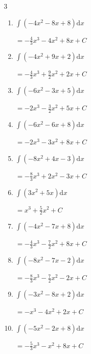\begin{multicols}{3}
\begin{enumerate}
        $\displaystyle =2x^{3}-4x^{2}+7x+ C$

  \item $\displaystyle \int \left( -4x^{2}-8x+8 \right) \mathrm{d}x$

        $\displaystyle =-\frac{4}{3}x^{3}-4x^{2}+8x+ C$

  \item $\displaystyle \int \left( -4x^{2}+9x+2 \right) \mathrm{d}x$

        $\displaystyle =-\frac{4}{3}x^{3}+\frac{9}{2}x^{2}+2x+ C$

  \item $\displaystyle \int \left( -6x^{2}-3x+5 \right) \mathrm{d}x$

        $\displaystyle =-2x^{3}-\frac{3}{2}x^{2}+5x+ C$

  \item $\displaystyle \int \left( -6x^{2}-6x+8 \right) \mathrm{d}x$

        $\displaystyle =-2x^{3}-3x^{2}+8x+ C$

  \item $\displaystyle \int \left( -8x^{2}+4x-3 \right) \mathrm{d}x$

        $\displaystyle =-\frac{8}{3}x^{3}+2x^{2}-3x+ C$

  \item $\displaystyle \int \left( 3x^{2}+5x \right) \mathrm{d}x$

        $\displaystyle =x^{3}+\frac{5}{2}x^{2}+ C$

  \item $\displaystyle \int \left( -4x^{2}-7x+8 \right) \mathrm{d}x$

        $\displaystyle =-\frac{4}{3}x^{3}-\frac{7}{2}x^{2}+8x+ C$

  \item $\displaystyle \int \left( -8x^{2}-7x-2 \right) \mathrm{d}x$

        $\displaystyle =-\frac{8}{3}x^{3}-\frac{7}{2}x^{2}-2x+ C$

\columnbreak %

\resetques

  \item $\displaystyle \int \left( -3x^{2}-8x+2 \right) \mathrm{d}x$

        $\displaystyle =-x^{3}-4x^{2}+2x+ C$

  \item $\displaystyle \int \left( -5x^{2}-2x+8 \right) \mathrm{d}x$

        $\displaystyle =-\frac{5}{3}x^{3}-x^{2}+8x+ C$


\end{enumerate}
\end{multicols}
